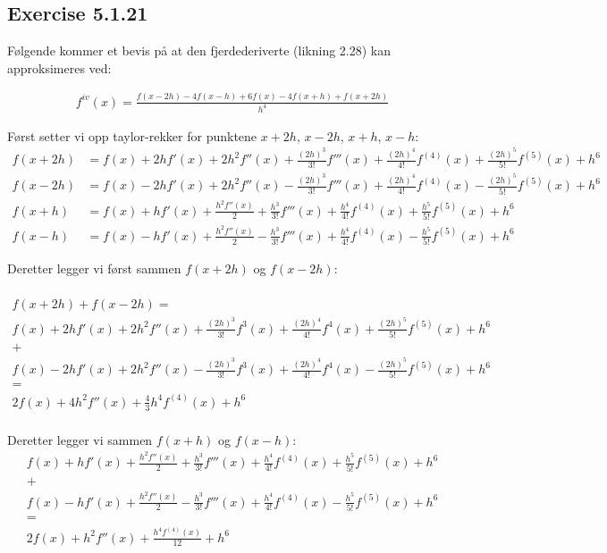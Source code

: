 \subsection{Exercise 5.1.21} 
\label{sec:exercise_5_1_21}
Følgende kommer et bevis på at den fjerdederiverte (likning 2.28) kan approksimeres ved: 

\begin{align}
    f^{iv}(x)=\frac{f(x-2h)-4f(x-h)+6f(x)-4f(x+h)+f(x+2h)}{h^4} \label{eq21:proove}
\end{align}

Først setter vi opp taylor-rekker for punktene $x+2h$, $x-2h$, $x+h$, $x-h$: 
\begin{align}
    f(x+2h)&=f(x)+2hf'(x)+2h^2f''(x)+\frac{(2h)^3}{3!}f'''(x)+\frac{(2h)^4}{4!}f^{(4)}(x)+\frac{(2h)^5}{5!}f^{(5)}(x)+h^6\nonumber\\ 
    f(x-2h)&=f(x)-2hf'(x)+2h^2f''(x)-\frac{(2h)^3}{3!}f'''(x)+\frac{(2h)^4}{4!}f^{(4)}(x)-\frac{(2h)^5}{5!}f^{(5)}(x)+h^6\nonumber\\
    f(x+h)&=f(x)+hf'(x)+\frac{h^2f''(x)}{2}+\frac{h^3}{3!}f'''(x)+\frac{h^4}{4!}f^{(4)}(x)+\frac{h^5}{5!}f^{(5)}(x)+h^6\nonumber\\
    f(x-h)&=f(x)-hf'(x)+\frac{h^2f''(x)}{2}-\frac{h^3}{3!}f'''(x)+\frac{h^4}{4!}f^{(4)}(x)-\frac{h^5}{5!}f^{(5)}(x)+h^6\label{Theory:taylorrekker}
\end{align}

Deretter legger vi først sammen $f(x+2h)$ og $f(x-2h)$: 

\begin{multline}
    \\
    f(x+2h)+f(x-2h)= \\
    f(x)+2hf'(x)+2h^2f''(x)+\frac{(2h)^3}{3!}f^3(x)+\frac{(2h)^4}{4!}f^{4}(x)+\frac{(2h)^5}{5!}f^{(5)}(x)+h^6 \\
    + \\
  	f(x)-2hf'(x)+2h^2f''(x)-\frac{(2h)^3}{3!}f^3(x)+\frac{(2h)^4}{4!}f^{4}(x)-\frac{(2h)^5}{5!}f^{(5)}(x)+h^6\nonumber \\
  	=\\
  	2f(x)+4h^2f''(x)+\frac{4}{3}h^4f^{(4)}(x)+h^6 \nonumber\\
\end{multline}

Deretter legger vi sammen $f(x+h)$ og $f(x-h)$: 
\begin{multline}
	f(x)+hf'(x)+\frac{h^2f''(x)}{2}+\frac{h^3}{3!}f'''(x)+\frac{h^4}{4!}f^{(4)}(x)+\frac{h^5}{5!}f^{(5)}(x)+h^6\\
	+\\
	f(x)-hf'(x)+\frac{h^2f''(x)}{2}-\frac{h^3}{3!}f'''(x)+\frac{h^4}{4!}f^{(4)}(x)-\frac{h^5}{5!}f^{(5)}(x)+h^6\\
	=\\
	2f(x)+h^2f''(x)+\frac{h^4f^{(4)}(x)}{12} + h^6 \nonumber \\
\end{multline}

